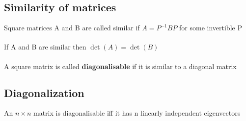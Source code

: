 \documentclass{article}[18pt]
\begin{document}
\subsection{Similarity of matrices}
Square matrices A and B are called similar if $A=P^{-1}BP$ for some invertible P\\
\\
If A and B are similar then $\det(A)=\det(B)$\\
\\
A square matrix is called \textbf{diagonalisable} if it is similar to a diagonal matrix
\subsection{Diagonalization}
An $n\times n$ matrix is diagonalisable iff it has n linearly independent eigenvectors
\end{document}
